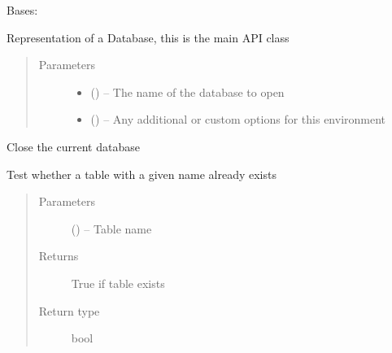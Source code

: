 \documentclass[letterpaper,10pt,english]{sphinxmanual}
\begin{document}
\begin{fulllineitems}
\label{\detokenize{index:mamba.Database}}
Bases: 

Representation of a Database, this is the main API class
\begin{quote}\begin{description}
\item[{Parameters}] \leavevmode\begin{itemize}
\item {} 
 () -- The name of the database to open

\item {} 
 () -- Any additional or custom options for this environment

\end{itemize}

\end{description}\end{quote}

\begin{fulllineitems}
\label{\detokenize{index:mamba.Database.close}}
Close the current database

\end{fulllineitems}


\begin{fulllineitems}
\label{\detokenize{index:mamba.Database.exists}}
Test whether a table with a given name already exists
\begin{quote}\begin{description}
\item[{Parameters}] \leavevmode
{} () -- Table name

\item[{Returns}] \leavevmode
True if table exists

\item[{Return type}] \leavevmode
bool

\end{description}\end{quote}


\end{fulllineitems}
\end{fulllineitems}
\end{document}

